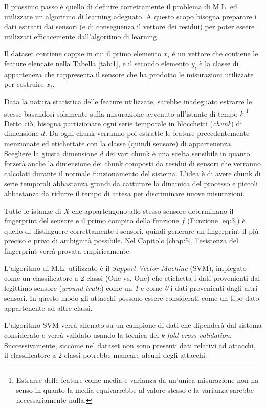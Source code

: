 \documentclass[Lau,binding=0.6cm]{sapthesis}
\begin{document}
Il prossimo passo \`e quello di definire correttamente il problema di M.L. ed utilizzare un algoritmo di learning adeguato.
A questo scopo bisogna preparare i dati estratti dai sensori (e di conseguenza il vettore dei residui) per poter essere utilizzati efficacemente dall'algoritmo di learning.

Il dataset contiene coppie in cui il primo elemento $x_i$ \`e un vettore che contiene le feature elencate nella Tabella \ref{tab:1}, e il secondo elemento $y_i$ \`e la classe di apparteneza che rappresenta il sensore che ha prodotto le misurazioni utilizzate per costruire $x_i$.

Data la natura statistica delle feature utilizzate, sarebbe inadeguato estrarre le stesse basandosi solamente sulla misurazione avvenuto all'istante di tempo $k$.\footnote{Estrarre delle feature come media e varianza da un'unica misurazione non ha senso in quanto la media equivarrebbe al valore stesso e la varianza sarebbe necessariamente nulla.}
Detto ci\`o, bisogna partizionare ogni serie temporale in blocchetti (\textit{chunk}) di dimensione $d$. 
Da ogni chunk verranno poi estratte le feature precedentemente menzionate ed etichettate con la classe (quindi sensore) di appartenenza.
Scegliere la giusta dimensione $d$ dei vari chunk \`e una scelta sensibile in quanto forzer\`a anche la dimensione dei chunk composti da residui di sensori che verranno calcolati durante il normale funzionamento del sistema.
L'idea \`e di avere chunk di serie temporali abbastanza grandi da catturare la dinamica del processo e piccoli abbastanza da ridurre il tempo di attesa per discriminare nuove misurazioni.

Tutte le istanze di $X$ che appartengono allo stesso sensore determinano il fingerprint del sensore e il primo compito della funzione $f$ (Funzione \ref{eq:3}) \`e quello di distinguere correttamente i sensori, 
quindi generare un fingerprint il pi\`u preciso e privo di ambiguit\`a possibile. Nel Capitolo \ref{chap:5}, l'esistenza del fingerprint verr\`a provata empiricamente.

L'algoritmo di M.L. utilizzato \`e il \textit{Support Vector Machine} (SVM)\cite{noble2006support}, impiegato come un classificatore a 2 classi (One vs. One) che etichetta i dati provenienti dal legittimo sensore (\textit{ground truth}) come un \textit{1}
e come \textit{0} i dati provenienti dagli altri sensori. In questo modo gli attacchi possono essere considerati come un tipo dato appartenente ad altre classi.

L'algoritmo SVM verr\`a allenato su un campione di dati che dipender\`a dal sistema considerato e verr\`a validato usando la tecnica del \textit{k-fold cross validation}\cite{refaeilzadeh2009cross}.
Successivamente, siccome nel dataset non sono presenti dati relativi ad attacchi, il classificatore a 2 classi potrebbe mancare alcuni degli attacchi.
\end{document}

